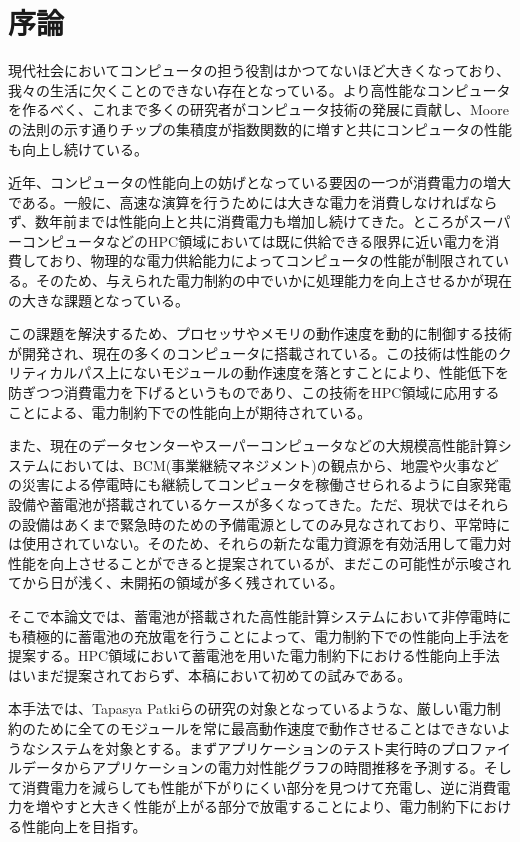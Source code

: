 \chapter{序論}

現代社会においてコンピュータの担う役割はかつてないほど大きくなっており、我々の生活に欠くことのできない存在となっている。より高性能なコンピュータを作るべく、これまで多くの研究者がコンピュータ技術の発展に貢献し、Mooreの法則\cite{mooreslaw}の示す通りチップの集積度が指数関数的に増すと共にコンピュータの性能も向上し続けている。

近年、コンピュータの性能向上の妨げとなっている要因の一つが消費電力の増大である。一般に、高速な演算を行うためには大きな電力を消費しなければならず、数年前までは性能向上と共に消費電力も増加し続けてきた。ところがスーパーコンピュータなどのHPC領域においては既に供給できる限界に近い電力を消費しており、物理的な電力供給能力によってコンピュータの性能が制限されている。そのため、与えられた電力制約の中でいかに処理能力を向上させるかが現在の大きな課題となっている。

この課題を解決するため、プロセッサやメモリの動作速度を動的に制御する技術が開発され、現在の多くのコンピュータに搭載されている。この技術は性能のクリティカルパス上にないモジュールの動作速度を落とすことにより、性能低下を防ぎつつ消費電力を下げるというものであり、この技術をHPC領域に応用することによる、電力制約下での性能向上が期待されている。

また、現在のデータセンターやスーパーコンピュータなどの大規模高性能計算システムにおいては、BCM(事業継続マネジメント)の観点から、地震や火事などの災害による停電時にも継続してコンピュータを稼働させられるように自家発電設備や蓄電池が搭載されているケースが多くなってきた。ただ、現状ではそれらの設備はあくまで緊急時のための予備電源としてのみ見なされており、平常時には使用されていない。そのため、それらの新たな電力資源を有効活用して電力対性能を向上させることができると提案されている\cite{Govindan:2011:BLT:2024723.2000105}が、まだこの可能性が示唆されてから日が浅く、未開拓の領域が多く残されている。

そこで本論文では、蓄電池が搭載された高性能計算システムにおいて非停電時にも積極的に蓄電池の充放電を行うことによって、電力制約下での性能向上手法を提案する。HPC領域において蓄電池を用いた電力制約下における性能向上手法はいまだ提案されておらず、本稿において初めての試みである。

本手法では、Tapasya Patkiらの研究\cite{Patki:2013:EHO:2464996.2465009}の対象となっているような、厳しい電力制約のために全てのモジュールを常に最高動作速度で動作させることはできないようなシステムを対象とする。まずアプリケーションのテスト実行時のプロファイルデータからアプリケーションの電力対性能グラフの時間推移を予測する。そして消費電力を減らしても性能が下がりにくい部分を見つけて充電し、逆に消費電力を増やすと大きく性能が上がる部分で放電することにより、電力制約下における性能向上を目指す。

